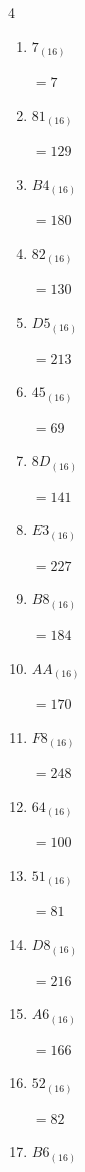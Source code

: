 \begin{multicols}{4}
\begin{enumerate}
  \item $7_{(16)}$

        $=7$

  \item $81_{(16)}$

        $=129$

  \item $B4_{(16)}$

        $=180$

  \item $82_{(16)}$

        $=130$

  \item $D5_{(16)}$

        $=213$

  \item $45_{(16)}$

        $=69$

  \item $8D_{(16)}$

        $=141$

  \item $E3_{(16)}$

        $=227$

  \item $B8_{(16)}$

        $=184$

  \item $AA_{(16)}$

        $=170$

  \item $F8_{(16)}$

        $=248$

\columnbreak %

  \item $64_{(16)}$

        $=100$

  \item $51_{(16)}$

        $=81$

  \item $D8_{(16)}$

        $=216$

  \item $A6_{(16)}$

        $=166$

  \item $52_{(16)}$

        $=82$

  \item $B6_{(16)}$


\end{enumerate}
\end{multicols}
